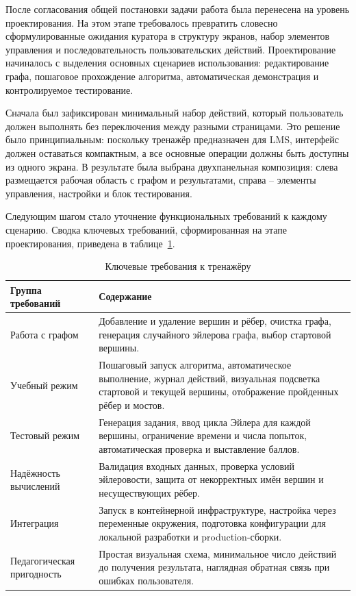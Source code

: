 \documentclass[a4paper,12pt]{extarticle}
\begin{document}
После согласования общей постановки задачи работа была перенесена на уровень проектирования. На этом этапе требовалось превратить словесно сформулированные ожидания куратора в структуру экранов, набор элементов управления и последовательность пользовательских действий. Проектирование начиналось с выделения основных сценариев использования: редактирование графа, пошаговое прохождение алгоритма, автоматическая демонстрация и контролируемое тестирование.

Сначала был зафиксирован минимальный набор действий, который пользователь должен выполнять без переключения между разными страницами. Это решение было принципиальным: поскольку тренажёр предназначен для LMS, интерфейс должен оставаться компактным, а все основные операции должны быть доступны из одного экрана. В результате была выбрана двухпанельная композиция: слева размещается рабочая область с графом и результатами, справа -- элементы управления, настройки и блок тестирования.

Следующим шагом стало уточнение функциональных требований к каждому сценарию. Сводка ключевых требований, сформированная на этапе проектирования, приведена в таблице~\ref{tab:requirements}.

\begin{table}[H]
\caption{Ключевые требования к тренажёру}
\label{tab:requirements}
\centering
\begin{tabular}{|p{3.5cm}|p{8.7cm}|}
\hline
\textbf{Группа требований} & \textbf{Содержание} \\ \hline
Работа с графом & Добавление и удаление вершин и рёбер, очистка графа, генерация случайного эйлерова графа, выбор стартовой вершины. \\ \hline
Учебный режим & Пошаговый запуск алгоритма, автоматическое выполнение, журнал действий, визуальная подсветка стартовой и текущей вершины, отображение пройденных рёбер и мостов. \\ \hline
Тестовый режим & Генерация задания, ввод цикла Эйлера для каждой вершины, ограничение времени и числа попыток, автоматическая проверка и выставление баллов. \\ \hline
Надёжность вычислений & Валидация входных данных, проверка условий эйлеровости, защита от некорректных имён вершин и несуществующих рёбер. \\ \hline
Интеграция & Запуск в контейнерной инфраструктуре, настройка через переменные окружения, подготовка конфигурации для локальной разработки и production-сборки. \\ \hline
Педагогическая пригодность & Простая визуальная схема, минимальное число действий до получения результата, наглядная обратная связь при ошибках пользователя. \\ \hline
\end{tabular}
\end{table}
\end{document}
